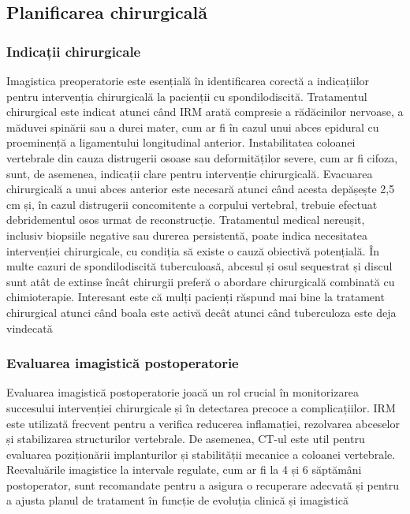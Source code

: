 \message{ !name(LaMain.tex)}\documentclass[romanian,12pt,a4paper]{article}
\begin{document}
\subsection{Planificarea chirurgicală}

\subsubsection{Indicații chirurgicale}

Imagistica preoperatorie este esențială în identificarea corectă a
indicațiilor pentru intervenția chirurgicală la pacienții cu
spondilodiscită. Tratamentul chirurgical este indicat atunci când IRM
arată compresie a rădăcinilor nervoase, a măduvei spinării sau a durei
mater, cum ar fi în cazul unui abces epidural cu proeminență a
ligamentului longitudinal anterior. Instabilitatea coloanei vertebrale
din cauza distrugerii osoase sau deformităților severe, cum ar fi
cifoza, sunt, de asemenea, indicații clare pentru intervenție
chirurgicală. Evacuarea chirurgicală a unui abces anterior este necesară
atunci când acesta depășește 2,5 cm și, în cazul distrugerii
concomitente a corpului vertebral, trebuie efectuat debridementul osos
urmat de reconstrucție. Tratamentul medical nereușit, inclusiv biopsiile
negative sau durerea persistentă, poate indica necesitatea intervenției
chirurgicale, cu condiția să existe o cauză obiectivă potențială. În
multe cazuri de spondilodiscită tuberculoasă, abcesul și osul sequestrat
și discul sunt atât de extinse încât chirurgii preferă o abordare
chirurgicală combinată cu chimioterapie. Interesant este că mulți
pacienți răspund mai bine la tratament chirurgical atunci când boala
este activă decât atunci când tuberculoza este deja vindecată
\cite{SurgicalTreatmentSpondylodiscitis2012}

\subsubsection{Evaluarea imagistică postoperatorie}

Evaluarea imagistică postoperatorie joacă un rol crucial în
monitorizarea succesului intervenției chirurgicale și în detectarea
precoce a complicațiilor. IRM este utilizată frecvent pentru a verifica
reducerea inflamației, rezolvarea abceselor și stabilizarea structurilor
vertebrale. De asemenea, CT-ul este util pentru evaluarea poziționării
implanturilor și stabilității mecanice a coloanei vertebrale.
Reevaluările imagistice la intervale regulate, cum ar fi la 4 și 6
săptămâni postoperator, sunt recomandate pentru a asigura o recuperare
adecvată și pentru a ajusta planul de tratament în funcție de evoluția
clinică și imagistică \cite{RetrospectiveStudySpondylodiscitis2020}
\pagebreak
\end{document}
